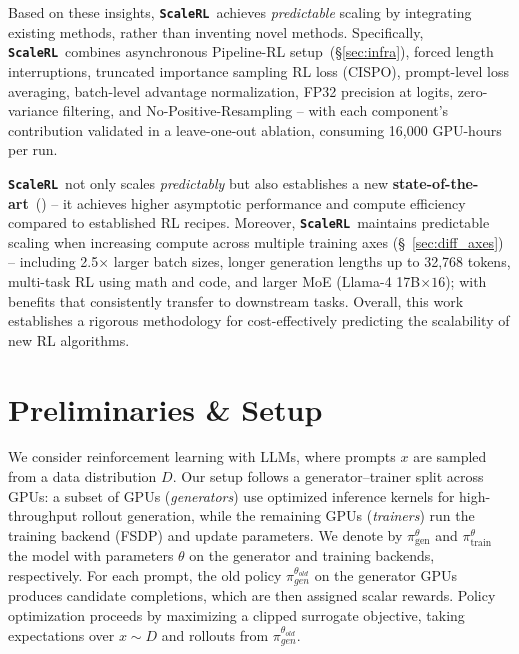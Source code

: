 \documentclass[]{fairmeta} %
\newcommand{\scalerl}{\texttt{\textbf{ScaleRL}}}
\begin{document}
Based on these insights, \scalerl\ achieves \emph{predictable} scaling by integrating existing methods, rather than inventing novel methods. Specifically, \scalerl\ combines asynchronous Pipeline-RL setup~(\S\ref{sec:infra}), forced length interruptions, truncated importance sampling RL loss (CISPO), prompt-level loss averaging, batch-level advantage normalization, FP32 precision at logits, zero-variance filtering, and No-Positive-Resampling -- with each component's contribution validated in a leave-one-out ablation, consuming 16,000 GPU-hours per run.


\scalerl\ not only scales \emph{predictably} but also establishes a new \textbf{state-of-the-art}~() -- it achieves higher asymptotic performance and compute efficiency compared to established RL recipes.  Moreover, \scalerl\ maintains predictable scaling when increasing compute across multiple training axes (\S~\ref{sec:diff_axes}) -- including 2.5$\times$ larger batch sizes, longer generation lengths up to 32,768 tokens, multi-task RL using math and code, and larger MoE (Llama-4 17B$\times16$); with benefits that consistently transfer to downstream tasks. Overall, this work establishes a rigorous methodology for cost-effectively predicting the scalability of new RL algorithms. 
\section{Preliminaries \& Setup}
\label{sec:methodology}

We consider reinforcement learning with LLMs, where prompts $x$ are sampled from a data distribution $D$. 
Our setup follows a generator–trainer split across GPUs: a subset of GPUs (\emph{generators}) use optimized inference kernels for high-throughput rollout generation, while the remaining GPUs (\emph{trainers}) run the training backend (FSDP) and update parameters. 
We denote by $\pi_{\text{gen}}^\theta$ and $\pi_{\text{train}}^\theta$ the model with parameters $\theta$ on the generator and training backends, respectively. 
For each prompt, the old policy $\pi_{gen}^{\theta_{old}}$ on the generator GPUs produces candidate completions, which are then assigned scalar rewards. 
Policy optimization proceeds by maximizing a clipped surrogate objective, taking expectations over $x \sim D$ and rollouts from $\pi_{gen}^{\theta_{old}}$.
\end{document}
